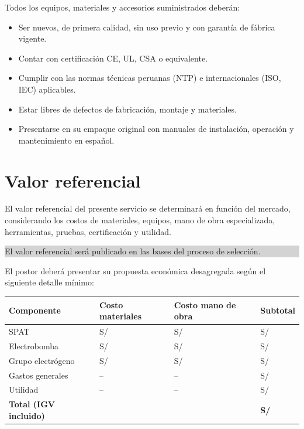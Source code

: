 \documentclass[12pt,a4paper]{article}
\begin{document}
Todos los equipos, materiales y accesorios suministrados deberán:
\begin{itemize}
  \item Ser nuevos, de primera calidad, sin uso previo y con garantía de fábrica vigente.
  \item Contar con certificación CE, UL, CSA o equivalente.
  \item Cumplir con las normas técnicas peruanas (NTP) e internacionales (ISO, IEC) aplicables.
  \item Estar libres de defectos de fabricación, montaje y materiales.
  \item Presentarse en su empaque original con manuales de instalación, operación y mantenimiento en español.
\end{itemize}

\section{Valor referencial}

El valor referencial del presente servicio se determinará en función del mercado, considerando los costos de materiales, equipos, mano de obra especializada, herramientas, pruebas, certificación y utilidad.

\begin{center}
\colorbox{lightgray}{\parbox{0.8\textwidth}{\centering El valor referencial será publicado en las bases del proceso de selección.}}
\end{center}

El postor deberá presentar su propuesta económica desagregada según el siguiente detalle mínimo:

\begin{center}
\begin{tabular}{L{4cm}L{2.5cm}L{2.5cm}L{2.5cm}}
\toprule
\textbf{Componente} & \textbf{Costo materiales} & \textbf{Costo mano de obra} & \textbf{Subtotal} \\
\midrule
SPAT & S/ & S/ & S/ \\
Electrobomba & S/ & S/ & S/ \\
Grupo electrógeno & S/ & S/ & S/ \\
Gastos generales & -- & -- & S/ \\
Utilidad & -- & -- & S/ \\
\midrule
\textbf{Total (IGV incluido)} & & & \textbf{S/ } \\
\bottomrule
\end{tabular}
\end{center}
\end{document}
